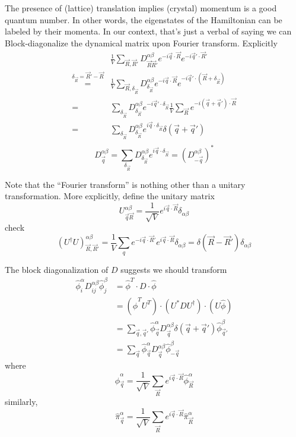 The presence of (lattice) translation implies (crystal) momentum is a good quantum number. In other words, the eigenstates of the Hamiltonian can be labeled by their momenta. In our context, that's just a verbal of saying we can Block-diagonalize the dynamical matrix upon Fourier transform. Explicitly
\begin{align*}
    &\frac{1}{V}\sum_{\vec{R},\vec{R}'}{D_{\vec{R}\vec{R}'}^{\alpha \beta}e^{-i\vec{q}\cdot \vec{R}}e^{-i\vec{q}'\cdot \vec{R}'}}\\
    \stackrel{\delta _{\vec{R}}=\vec{R}'-\vec{R}}{=}&\frac{1}{V}\sum_{\vec{R},\delta _{\vec{R}}}{D_{\delta _{\vec{R}}}^{\alpha \beta}e^{-i\vec{q}\cdot \vec{R}}e^{-i\vec{q}'\cdot \left( \vec{R}+\delta _{\vec{R}} \right)}}\\
    =&\sum_{\delta _{\vec{R}}}{D_{\delta _{\vec{R}}}^{\alpha \beta}e^{-i\vec{q}'\cdot \delta _{\vec{R}}}\frac{1}{V}\sum_{\vec{R}}{e^{-i\left( \vec{q}+\vec{q}' \right) \cdot \vec{R}}}}\\
    =&\sum_{\delta _{\vec{R}}}{D_{\delta _{\vec{R}}}^{\alpha \beta}e^{i\vec{q}\cdot \delta _{\vec{R}}}}\delta \left( \vec{q}+\vec{q}' \right) \\
\end{align*}
\[ D_{\vec{q}}^{\alpha \beta}=\sum_{\delta _{\vec{R}}}{D_{\delta _{\vec{R}}}^{\alpha \beta}e^{i\vec{q}\cdot \delta _{\vec{R}}}}=\left( D_{-\vec{q}}^{\alpha \beta} \right) ^*\]

Note that the ``Fourier transform'' is nothing other than a unitary transformation. More explicitly, define the unitary matrix
\[ U_{\vec{q}\vec{R}}^{\alpha \beta}=\frac{1}{\sqrt{V}}e^{i\vec{q}\cdot \vec{R}}\delta _{\alpha \beta}\]
check
\[ \left( U^{\dagger}U \right) _{\vec{R},\vec{R}'}^{\alpha \beta}=\frac{1}{V}\sum_q{e^{-i\vec{q}\cdot \vec{R}'}e^{i\vec{q}\cdot \vec{R}}\delta _{\alpha \beta}}=\delta \left( \vec{R}-\vec{R}' \right) \delta _{\alpha \beta}\]

The block diagonalization of $D$ suggests we should transform
\begin{align*}
    \hat{\phi}_{i}^{\alpha}D_{ij}^{\alpha \beta}\hat{\phi}_{j}^{\beta}&=\hat{\phi}^T\cdot D\cdot \hat{\phi}\\
    &=\left( \hat{\phi}^TU^T \right) \cdot \left( U^*DU^{\dagger} \right) \cdot \left( U\hat{\phi} \right) \\
    &=\sum_{\vec{q},\vec{q}'}{\hat{\phi}_{\vec{q}}^{\alpha}D_{\vec{q}}^{\alpha \beta}\delta \left( \vec{q}+\vec{q}' \right) \hat{\phi}_{\vec{q}'}^{\beta}}\\
    &=\sum_{\vec{q}}{\hat{\phi}_{\vec{q}}^{\alpha}D_{\vec{q}}^{\alpha \beta}\hat{\phi}_{-\vec{q}}^{\beta}}
\end{align*}
where
\[ \hat{\phi}_{\vec{q}}^{\alpha}=\frac{1}{\sqrt{V}}\sum_{\vec{R}}{e^{i\vec{q}\cdot \vec{R}}\hat{\phi}_{\vec{R}}^{\alpha}} \]
similarly,
\[ \hat{\pi}_{\vec{q}}^{\alpha}=\frac{1}{\sqrt{V}}\sum_{\vec{R}}{e^{i\vec{q}\cdot \vec{R}}\hat{\pi}_{\vec{R}}^{\alpha}} \]

